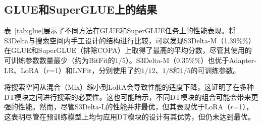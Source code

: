 
\subsection{GLUE和SuperGLUE上的结果}
\label{sec:resultsonglue}
表~\ref{tab:glue}展示了不同方法在GLUE和SuperGLUE任务上的性能表现。将S3Delta与搜索空间内手工设计的结构进行比较，可以发现S3Delta-M（1.39\%\%）在GLUE和SuperGLUE（排除COPA）上取得了最高的平均分数，尽管其使用的可训练参数数量最少（约为BitFit的$1/5$）。S3Delta-M（0.35\%\%）也优于Adapter-LR、LoRA（$r$=1）和LNFit，分别使用了约$1/12$、$1/8$和$1/5$的可训练参数。

将搜索空间从混合（Mix）缩小到LoRA会导致性能的适度下降，这证明了在多种DT模块之间进行搜索的必要性。这也可能暗示，不同DT模块的组合可能会带来更强的性能。然而，尽管S3Delta-L的性能并非最优，但其表现优于LoRA（$r$=1），这表明尽管在预训练模型上均匀应用DT模块的设计有其优势，但仍未达到最优。

